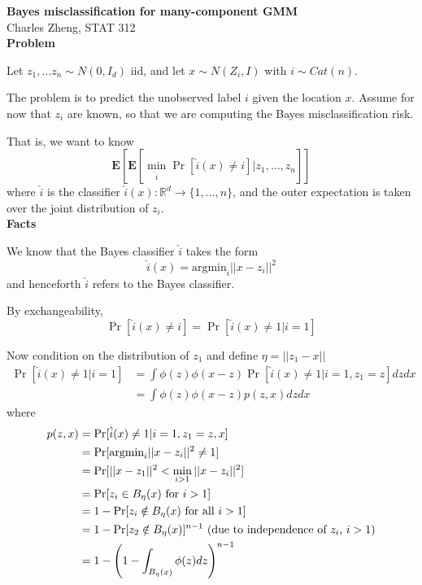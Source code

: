 \documentclass[11pt]{article}
\begin{document}
\newcommand{\tr}{\text{tr}}
\newcommand{\E}{\textbf{E}}
\newcommand{\diag}{\text{diag}}
\newcommand{\argmax}{\text{argmax}}
\newcommand{\argmin}{\text{argmin}}
\newcommand{\Cov}{\text{Cov}}



\noindent\textbf{Bayes misclassification for many-component GMM}\\
Charles Zheng, STAT 312
\\

\noindent\textbf{Problem}

Let $z_1,\hdots z_n \sim N(0, I_d)$ iid, and let $x \sim N(Z_i,
I)$ with $i \sim Cat(n)$.

The problem is to predict the unobserved label $i$ given the
location $x$.  Assume for now that $z_i$ are known, so that we are
computing the Bayes misclassification risk.

That is, we want to know
\[
\E[\E[\min_{\hat{i}} \Pr[\hat{i}(x) \neq i]| z_1,\hdots, z_n]]
\]
where $\hat{i}$ is the classifier $\hat{i}(x): \mathbb{R}^d \to \{1, \hdots, n\}$, and the outer expectation is taken over the joint distribution of $z_i$.
\\

\noindent\textbf{Facts}

We know that the Bayes classifier $\hat{i}$ takes the form
\[
\hat{i}(x) = \argmin_i ||x - z_i||^2
\]
and henceforth $\hat{i}$ refers to the Bayes classifier.

By exchangeability,
\[
\Pr[\hat{i}(x) \neq i] = \Pr[\hat{i}(x) \neq 1 | i = 1]
\]

Now condition on the distribution of $z_1$ and define $\eta = ||z_1 - x||$
\begin{align*}
\Pr[\hat{i}(x) \neq 1 | i = 1] &= \int \phi(z) \phi(x-z) \Pr[\hat{i}(x) \neq 1 | i = 1, z_1 = z] dz dx\\
&= \int \phi(z) \phi(x-z) p(z, x) dz dx
\end{align*}
where
\begin{align*}
p(z, x) 
&= \Pr[\hat{i}(x) \neq 1 | i = 1, z_1 = z, x]
\\&= \Pr[\argmin_i ||x - z_i||^2 \neq 1]
\\&= \Pr[||x - z_1||^2 < \min_{i > 1} ||x- z_i||^2]
\\&= \Pr[z_i \in B_\eta(x)\text{ for } i > 1]
\\&= 1 - \Pr[z_i \notin B_\eta(x)\text{ for all } i > 1]
\\&= 1 - \Pr[z_2 \notin B_\eta(x)]^{n-1} \text{ (due to independence of $z_i$, $ i > 1$)}
\\&= 1 - \left(1 - \int_{B_\eta(x)} \phi(z) dz \right)^{n-1}
\end{align*}
\end{document}
